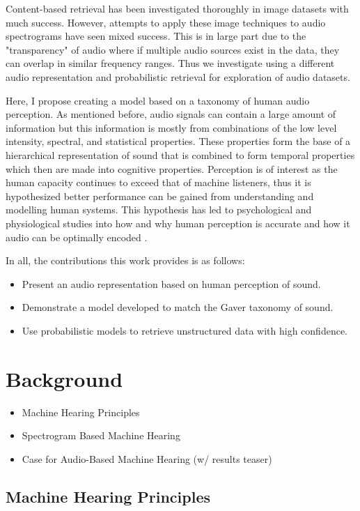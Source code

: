 Content-based retrieval has been investigated thoroughly in image datasets with much success. However, attempts to apply these image techniques to audio spectrograms have seen mixed success. This is in large part due to the "transparency" of audio where if multiple audio sources exist in the data, they can overlap in similar frequency ranges. Thus we investigate using a different audio representation and probabilistic retrieval for exploration of audio datasets.

Here, I propose creating a model based on a taxonomy of human audio perception. As mentioned before, audio signals can contain a large amount of information but this information is mostly from combinations of the low level intensity, spectral, and statistical properties. These properties form the base of a hierarchical representation of sound that is combined to form temporal properties which then are made into cognitive properties. Perception is of interest as the human capacity continues to exceed that of machine listeners, thus it is hypothesized better performance can be gained from understanding and modelling human systems. This hypothesis has led to psychological and physiological studies into how and why human perception is accurate and how it audio can be optimally encoded \cite{Gaver1993, Eggermont2001, slaney1993importance, Piazza2013}.

In all, the contributions this work provides is as follows:
\begin{itemize}
    \item Present an audio representation based on human perception of sound.
    \item Demonstrate a model developed to match the Gaver taxonomy of sound.
    \item Use probabilistic models to retrieve unstructured data with high confidence.
\end{itemize}

\section{Background}
\begin{itemize}
    \item Machine Hearing Principles
    \item Spectrogram Based Machine Hearing
    \item Case for Audio-Based Machine Hearing (w/ results teaser)
\end{itemize}

\subsection{Machine Hearing Principles}

